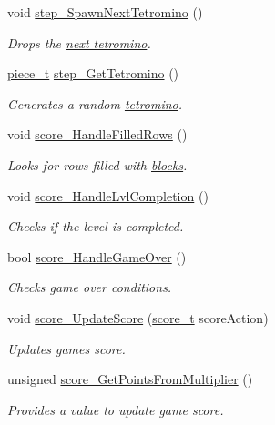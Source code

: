 \begin{DoxyCompactItemize}
void \hyperlink{classTetreesEngine_a446196c2260e2ce2ac0d18848ee6b636}{step\+\_\+\+Spawn\+Next\+Tetromino} ()
\begin{DoxyCompactList}\small\item\em Drops the \hyperlink{classTetreesEngine_a44c902481f5d8a72ca8a78d24f5c3a33}{next tetromino}. \end{DoxyCompactList}\item 
\hyperlink{structpiece__t}{piece\+\_\+t} \hyperlink{classTetreesEngine_a94d5fd25eec05994f02bb514496ec66d}{step\+\_\+\+Get\+Tetromino} ()
\begin{DoxyCompactList}\small\item\em Generates a random \hyperlink{TetreesDefs_8hpp_adf4f8e2cbbd7d8894fe3beda39db1b8f}{tetromino}. \end{DoxyCompactList}\item 
void \hyperlink{classTetreesEngine_ad379bf5d98a182411d4d91b12b6ef5ba}{score\+\_\+\+Handle\+Filled\+Rows} ()
\begin{DoxyCompactList}\small\item\em Looks for rows filled with \hyperlink{TetreesDefs_8hpp_ad8f0654cf997b7ea7eb14924d0b1ea33}{blocks}. \end{DoxyCompactList}\item 
void \hyperlink{classTetreesEngine_aa7d501cb6f73111321e1dadbc140ebc8}{score\+\_\+\+Handle\+Lvl\+Completion} ()
\begin{DoxyCompactList}\small\item\em Checks if the level is completed. \end{DoxyCompactList}\item 
bool \hyperlink{classTetreesEngine_a31898b1228f8b0381a82871669503b34}{score\+\_\+\+Handle\+Game\+Over} ()
\begin{DoxyCompactList}\small\item\em Checks game over conditions. \end{DoxyCompactList}\item 
void \hyperlink{classTetreesEngine_a856a9de6a79138a19b638d9287d7bc72}{score\+\_\+\+Update\+Score} (\hyperlink{TetreesDefs_8hpp_a5a3b4d94c69ae85b911a8dca1afedfe0}{score\+\_\+t} score\+Action)
\begin{DoxyCompactList}\small\item\em Updates game\textquotesingle{}s score. \end{DoxyCompactList}\item 
unsigned \hyperlink{classTetreesEngine_a848fc0ff4003f3c4d74c11efdc91f0cb}{score\+\_\+\+Get\+Points\+From\+Multiplier} ()
\begin{DoxyCompactList}\small\item\em Provides a value to update game score. \end{DoxyCompactList}\end{DoxyCompactItemize}
